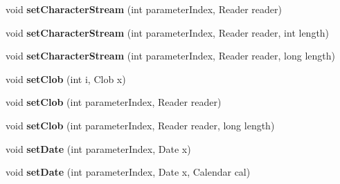 \begin{DoxyCompactItemize}
\item 
\mbox{\label{interfacecom_1_1mysql_1_1cj_1_1_query_bindings_a9a8a5478dc70771dc426208803ca9b91}} 
void {\bfseries set\+Character\+Stream} (int parameter\+Index, Reader reader)
\item 
\mbox{\label{interfacecom_1_1mysql_1_1cj_1_1_query_bindings_a0f1c2e28ff5e3e383b224d033019957b}} 
void {\bfseries set\+Character\+Stream} (int parameter\+Index, Reader reader, int length)
\item 
\mbox{\label{interfacecom_1_1mysql_1_1cj_1_1_query_bindings_af4d619fe54e4d6b4354a9fa91ba1d198}} 
void {\bfseries set\+Character\+Stream} (int parameter\+Index, Reader reader, long length)
\item 
\mbox{\label{interfacecom_1_1mysql_1_1cj_1_1_query_bindings_a4238c9057d5f6e2dff678d434a22531e}} 
void {\bfseries set\+Clob} (int i, Clob x)
\item 
\mbox{\label{interfacecom_1_1mysql_1_1cj_1_1_query_bindings_a48fdd80cf86791a397b1bcbbd9292b2c}} 
void {\bfseries set\+Clob} (int parameter\+Index, Reader reader)
\item 
\mbox{\label{interfacecom_1_1mysql_1_1cj_1_1_query_bindings_a45e48842db6bc099326134eaeb02012e}} 
void {\bfseries set\+Clob} (int parameter\+Index, Reader reader, long length)
\item 
\mbox{\label{interfacecom_1_1mysql_1_1cj_1_1_query_bindings_a48a6f44ba31b49e2e6ebaabf412a4643}} 
void {\bfseries set\+Date} (int parameter\+Index, Date x)
\item 
\mbox{\label{interfacecom_1_1mysql_1_1cj_1_1_query_bindings_a6047456befc84a09bb722b296b105513}} 
void {\bfseries set\+Date} (int parameter\+Index, Date x, Calendar cal)
\item 
\mbox{\label{interfacecom_1_1mysql_1_1cj_1_1_query_bindings_a3eaaf6a0ab026896f99512a7e51800e2}} 

\end{DoxyCompactItemize}
